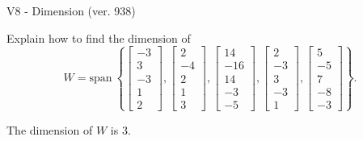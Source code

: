 \begin{exercise}
  \begin{exerciseTitle}V8 - Dimension (ver. 938)\end{exerciseTitle}
  \begin{exerciseStatement}
    Explain how to find the dimension of 
\[W=\mathrm{span}\ \left\{\left[\begin{array}{r}
-3 \\
3 \\
-3 \\
1 \\
2
\end{array}\right] , \left[\begin{array}{r}
2 \\
-4 \\
2 \\
1 \\
3
\end{array}\right] , \left[\begin{array}{r}
14 \\
-16 \\
14 \\
-3 \\
-5
\end{array}\right] , \left[\begin{array}{r}
2 \\
-3 \\
3 \\
-3 \\
1
\end{array}\right] , \left[\begin{array}{r}
5 \\
-5 \\
7 \\
-8 \\
-3
\end{array}\right]\right\}.\]



  \end{exerciseStatement}
  \begin{exerciseAnswer}
   The dimension of \(W\) is  \(3\).
  


  \end{exerciseAnswer}
\end{exercise}